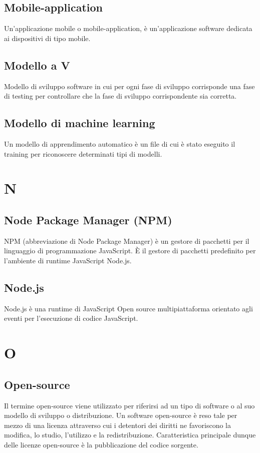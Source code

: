 \subsection{Mobile-application}  Un'applicazione mobile o mobile-application, è un'applicazione software dedicata ai dispositivi di tipo mobile.
\subsection{Modello a V}  Modello di sviluppo software in cui per ogni fase di sviluppo corrisponde una fase di testing per controllare che la fase di sviluppo corrispondente sia corretta.
\subsection{Modello di machine learning}  Un modello di apprendimento automatico è un file di cui è stato eseguito il training per riconoscere determinati tipi di modelli.

\newpage \section{N}
\subsection{Node Package Manager (NPM)}  NPM (abbreviazione di Node Package Manager) è un gestore di pacchetti per il linguaggio di programmazione JavaScript. È il gestore di pacchetti predefinito per l'ambiente di runtime JavaScript Node.js.
\subsection{Node.js}  Node.js è una runtime di JavaScript Open source multipiattaforma orientato agli eventi per l'esecuzione di codice JavaScript.

\newpage \section{O}
\subsection{Open-source}  Il termine open-source  viene utilizzato per riferirsi ad un tipo di software o al suo modello di sviluppo o distribuzione. Un software open-source è reso tale per mezzo di una licenza attraverso cui i detentori dei diritti ne favoriscono la modifica, lo studio, l'utilizzo e la redistribuzione. Caratteristica principale dunque delle licenze open-source è la pubblicazione del codice sorgente.
